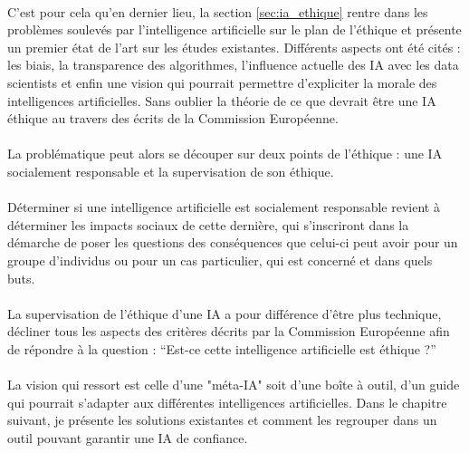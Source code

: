 \documentclass[10pt, french, a4paper]{report}
\begin{document}
\paragraph{}
C’est pour cela qu’en dernier lieu, la section \ref{sec:ia_ethique} rentre dans les problèmes soulevés par l’intelligence artificielle sur le plan de l’éthique et présente un premier état de l’art sur les études existantes. Différents aspects ont été cités : les biais, la transparence des algorithmes, l’influence actuelle des IA avec les data scientists et enfin une vision qui pourrait permettre d’expliciter la morale des intelligences artificielles. Sans oublier la théorie de ce que devrait être une IA éthique au travers des écrits de la Commission Européenne.

\paragraph{}
La problématique peut alors se découper sur deux points de l’éthique : une IA socialement responsable et la supervisation de son éthique.

\paragraph{}
Déterminer si une intelligence artificielle est socialement responsable revient à déterminer les impacts sociaux de cette dernière, qui s’inscriront dans la démarche de poser les questions des conséquences que celui-ci peut avoir pour un groupe d’individus ou pour un cas particulier, qui est concerné et dans quels buts.

\paragraph{}
La supervisation de l'éthique d'une IA a pour différence d'être plus technique, décliner tous les aspects des critères décrits par la Commission Européenne afin de répondre à la question : ``Est-ce cette intelligence artificielle est éthique ?''

\paragraph{}
La vision qui ressort est celle d’une "méta-IA" soit d’une boîte à outil, d’un guide qui pourrait s’adapter aux différentes intelligences artificielles. Dans le chapitre suivant, je présente les solutions existantes et comment les regrouper dans un outil pouvant garantir une IA de confiance.
\end{document}
